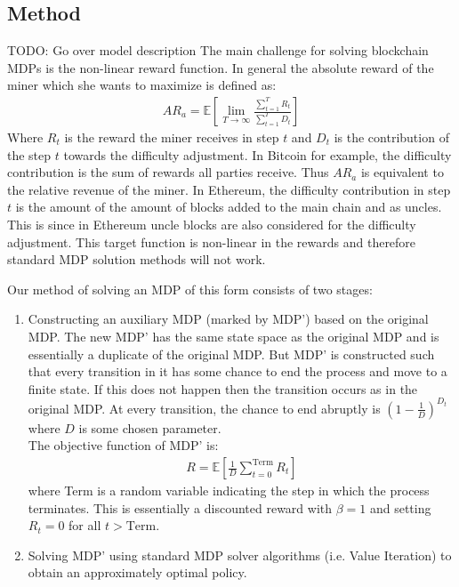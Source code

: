 \documentclass{article}
\newcommand{\E}[1]{\mathbb{E} \left[ #1 \right]}
\begin{document}
\subsection{Method}
TODO: Go over model description
The main challenge for solving blockchain MDPs is the non-linear reward function. In general the absolute reward of the miner which she wants to maximize is defined as:
\begin{gather*}\label{original_AR_def}
    AR_a = \E{\lim\limits_{T\to\infty} \frac{\sum\limits_{t=1}^T R_t}{\sum\limits_{t=1}^T D_t}}
\end{gather*}
Where $R_t$ is the reward the miner receives in step $t$ and $D_t$ is the contribution of the step $t$ towards the difficulty adjustment. In Bitcoin for example, the difficulty contribution is the sum of rewards all parties receive. Thus $AR_a$ is equivalent to the relative revenue of the miner. In Ethereum, the difficulty contribution in step $t$ is the amount of the amount of blocks added to the main chain and as uncles. This is since in Ethereum uncle blocks are also considered for the difficulty adjustment. This target function is non-linear in the rewards and therefore standard MDP solution methods will not work.

Our method of solving an MDP of this form consists of two stages:
\begin{enumerate}
    \item Constructing an auxiliary MDP (marked by MDP') based on the original MDP. The new MDP' has the same state space as the original MDP and is essentially a duplicate of the original MDP. But MDP' is constructed such that every transition in it has some chance to end the process and move to a finite state. If this does not happen then the transition occurs as in the original MDP.
    At every transition, the chance to end abruptly is $(1 - \frac{1}{D})^{D_t}$ where $D$ is some chosen parameter.\\
    The objective function of MDP' is:
    \begin{gather*}
        R = \E{\frac{1}{D} \sum\limits_{t=0}^\text{Term} R_t}
    \end{gather*}
    where Term is a random variable indicating the step in which the process terminates. This is essentially a discounted reward with $\beta = 1$ and setting $R_t = 0$ for all $t > \text{Term}$.
    \item Solving MDP' using standard MDP solver algorithms (i.e. Value Iteration) to obtain an approximately optimal policy.
\end{enumerate}
\end{document}
